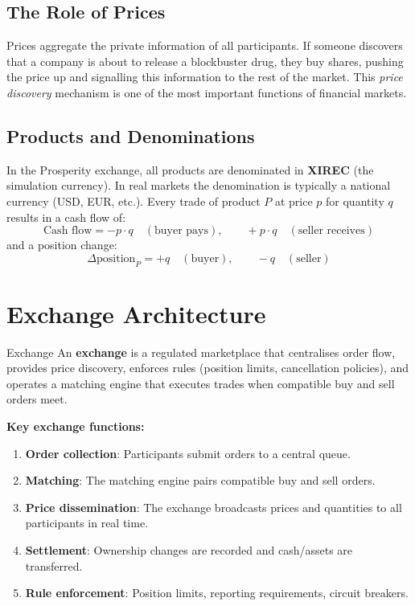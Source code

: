 \documentclass[12pt,a4paper,openany]{report}
\theoremstyle{definition}
\begin{document}
\subsection{The Role of Prices}

Prices aggregate the private information of all participants. If someone discovers that a company is about to release a blockbuster drug, they buy shares, pushing the price up and signalling this information to the rest of the market. This \emph{price discovery} mechanism is one of the most important functions of financial markets.

\subsection{Products and Denominations}

In the Prosperity exchange, all products are denominated in \textbf{XIREC} (the simulation currency). In real markets the denomination is typically a national currency (USD, EUR, etc.). Every trade of product $P$ at price $p$ for quantity $q$ results in a cash flow of:
\begin{equation}
  \text{Cash flow} = -p \cdot q \quad (\text{buyer pays}), \qquad +p \cdot q \quad (\text{seller receives})
\end{equation}
and a position change:
\begin{equation}
  \Delta \text{position}_P = +q \quad (\text{buyer}), \qquad -q \quad (\text{seller})
\end{equation}

\section{Exchange Architecture}

\begin{definitionbox}{Exchange}
An \textbf{exchange} is a regulated marketplace that centralises order flow, provides price discovery, enforces rules (position limits, cancellation policies), and operates a matching engine that executes trades when compatible buy and sell orders meet.
\end{definitionbox}

\noindent\textbf{Key exchange functions:}
\begin{enumerate}[label=\arabic*.]
  \item \textbf{Order collection}: Participants submit orders to a central queue.
  \item \textbf{Matching}: The matching engine pairs compatible buy and sell orders.
  \item \textbf{Price dissemination}: The exchange broadcasts prices and quantities to all participants in real time.
  \item \textbf{Settlement}: Ownership changes are recorded and cash/assets are transferred.
  \item \textbf{Rule enforcement}: Position limits, reporting requirements, circuit breakers.
\end{enumerate}
\end{document}
